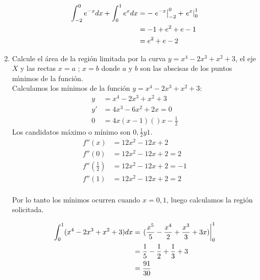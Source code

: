 \documentclass[letterpaper,10pt]{article}
\newcommand{\dis}{\displaystyle}
\begin{document}
\begin{enumerate}
\begin{figure}[!htb]
\begin{minipage}{0.6\textwidth}
   \end{minipage}
   \begin {minipage}{0.3\textwidth}
     
   \end{minipage}
\end{figure}

\begin{align*}
\dis \int_{-2}^0 e^{-x}dx + \int_{0}^1 e^{x}dx &= \displaystyle   -\left.e^{-x}\right|_{-2}^{0} + \left.e^{x}\right|_{0}^{1}\\
\dis  &= -1 + e^2+e-1\\
\dis  &= e^2+e-2
\end{align*}


\newpage
\item Calcule el \'{a}rea de la regi\'{o}n limitada por la curva
$y=x^4-2x^3+x^2+3$, el eje $X$ y las rectas $x=a$ ; $x=b$ donde  $a$
y $b$ son las abscisas de los puntos m\'{\i}nimos de la funci\'{o}n.\\

Calculamos los mínimos de la función  $y=x^4-2x^3+x^2+3$:\\
\begin{align*}
\dis y &= x^4-2x^3+x^2+3\\
\dis y' &= 4x^3- 6x^2+2x =0\\
\dis  0&= 4x(x-1)()x-\frac{1}{2}
\end{align*}
Los candidatos máximo o mínimo son ${0,\frac{1}{2} y 1}$.
\begin{align*}
\dis f''(x) &=12x^2-12x+2\\
\dis f''(0) &=12x^2-12x+2 = 2\\
\dis  f''(\frac{1}{2}) &=12x^2-12x+2 = -1\\
\dis  f''(1) &=12x^2-12x+2 = 2\\
\end{align*}

Por lo tanto los mínimos ocurren cuando $x ={0,1}$, luego calculamos la región solicitada.

\begin{align*}
\dis \int_{0}^1 (x^4-2x^3+x^2+3)dx &= \displaystyle   \left.(\frac{x^5}{5}- \frac{x^4}{2} + \frac{x^3}{3} + 3x)\right|_{0}^{1}\\
\dis  &= \frac{1}{5} - \frac{1}{2} + \frac{1}{3} + 3\\
\dis  &= \frac{91}{30}
\end{align*}




\end{enumerate}
\end{document}
